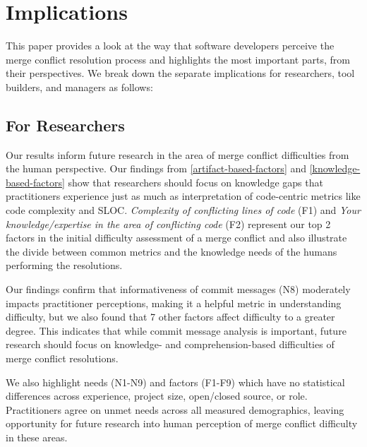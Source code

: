 \section{Implications}\label{implications}

This paper provides a look at the way that software developers perceive the merge conflict resolution process and highlights the most important parts, from their perspectives. We break down the separate implications for researchers, tool builders, and managers as follows:

\subsection{For Researchers}
Our results inform future research in the area of merge conflict difficulties from the human perspective.
Our findings from \ref{artifact-based-factors} and \ref{knowledge-based-factors} show that researchers should focus on knowledge gaps that practitioners experience just as much as interpretation of code-centric metrics like code complexity and SLOC. \textit{Complexity of conflicting lines of code} (F1) and \textit{Your knowledge/expertise in the area of conflicting code} (F2) represent our top 2 factors in the initial difficulty assessment of a merge conflict and also illustrate the divide between common metrics and the knowledge needs of the humans performing the resolutions.
 
Our findings confirm that informativeness of commit messages (N8) moderately impacts practitioner perceptions, making it a helpful metric in understanding difficulty, but we also found that 7 other factors affect difficulty to a greater degree. This indicates that while commit message analysis is important, future research should focus on knowledge- and comprehension-based difficulties of  merge conflict resolutions.

We also highlight needs (N1-N9) and factors (F1-F9) which have no statistical differences across experience, project size, open/closed source, or role. Practitioners agree on unmet needs across all measured demographics, leaving opportunity for future research into human perception of merge conflict difficulty in these areas.

